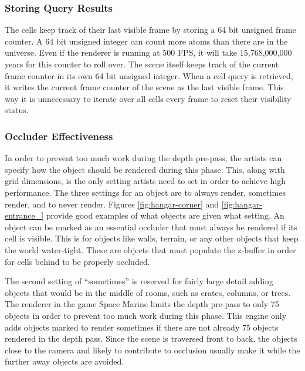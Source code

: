 \documentclass[12pt]{ucthesis}
\begin{document}
\subsubsection{Storing Query Results}
\label{storing-query-results}

The cells keep track of their last visible frame by storing a 64 bit unsigned frame counter.
A 64 bit unsigned integer can count more atoms than there are in the universe.
Even if the renderer is running at 500 FPS, it will take 15,768,000,000 years for this counter to roll over.
The scene itself keeps track of the current frame counter in its own 64 bit unsigned integer.
When a cell query is retrieved, it writes the current frame counter of the scene as the last visible frame.
This way it is unnecessary to iterate over all cells every frame to reset their visibility status.

\subsubsection{Occluder Effectiveness}
\label{occluder-effectiveness}

In order to prevent too much work during the depth pre-pass, the artists can specify how the object should be rendered during this phase.
This, along with grid dimensions, is the only setting artists need to set in order to achieve high performance.
The three settings for an object are to always render, sometimes render, and to never render.
Figures \ref{fig:hangar-corner} and \ref{fig:hangar-entrance_} provide good examples of what objects are given what setting.
An object can be marked as an essential occluder that must always be rendered if its cell is visible.
This is for objects like walls, terrain, or any other objects that keep the world water-tight.
These are objects that must populate the z-buffer in order for cells behind to be properly occluded.

The second setting of ``sometimes'' is reserved for fairly large detail adding objects that would be in the middle of rooms, such as crates, columns, or trees.
The renderer in the game Space Marine limits the depth pre-pass to only 75 objects in order to prevent too much work during this phase.\cite{spaceMarine}
This engine only adds objects marked to render sometimes if there are not already 75 objects rendered in the depth pass.
Since the scene is traversed front to back, the objects close to the camera and likely to contribute to occlusion usually make it while the further away objects are avoided.
\end{document}
